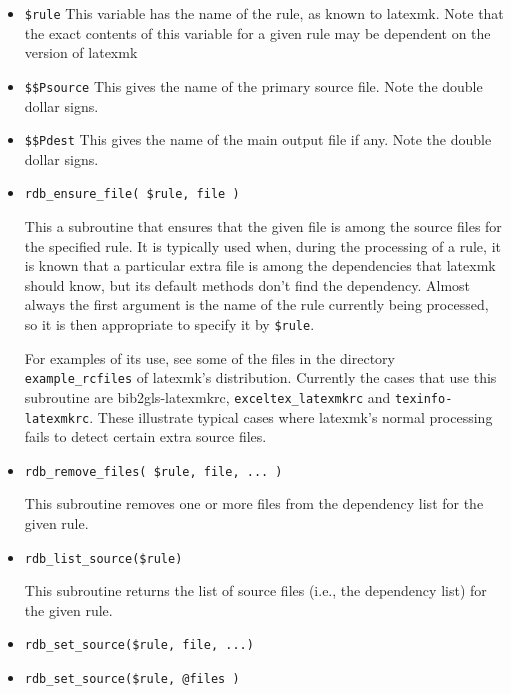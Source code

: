 \begin{itemize}
	

       \item \verb|$rule|  This  variable  has  the  name of the rule, as known to latexmk.
              Note that the exact contents of this variable for a  given  rule
              may be dependent on the version of latexmk

       \item \verb|$$Psource|
              This gives the name of the primary source file.  Note the double
              dollar signs.

       \item \verb|$$Pdest|
              This gives the name of the main output file if  any.   Note  the
              double dollar signs.


			 \item \verb|rdb_ensure_file( $rule, file )|

This  a subroutine that ensures that the given file is among the
source files for the specified rule.  It is typically used when,
during  the  processing of a rule, it is known that a particular extra file is
among the dependencies that latexmk  should  know, but its default methods
don't find the dependency. Almost always the first argument is the name of the
rule currently being  processed, so it is then appropriate to specify it by
\verb|$rule|.

For  examples of its use, see some of the files in the directory
\verb|example_rcfiles| of latexmk's distribution.  Currently the  cases that
use  this  subroutine  are bib2gls-latexmkrc, \verb|exceltex_latexmkrc| and
\verb|texinfo-latexmkrc|.  These illustrate  typical  cases where  latexmk's
normal processing fails to detect certain extra source files.

			 \item \verb|rdb_remove_files( $rule, file, ... )|

This subroutine removes one or more files  from  the  dependency
list for the given rule.

\item \verb|rdb_list_source($rule)|

This  subroutine returns the list of source files (i.e., the dependency list) for the given rule.

\item \verb|rdb_set_source($rule, file, ...)|
\item \verb|rdb_set_source($rule, @files )|


\end{itemize}
